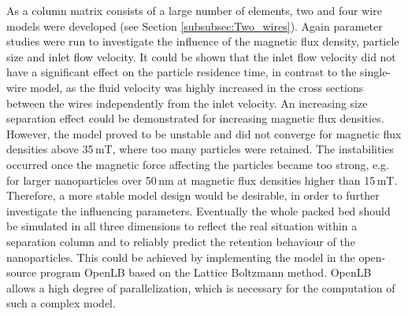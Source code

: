As a column matrix consists of a large number of elements, two and four wire models were developed (see Section \ref{subsubsec:Two_wires}). Again parameter studies were run to investigate the influence of the magnetic flux density, particle size and inlet flow velocity. It could be shown that the inlet flow velocity did not have a significant effect on the particle residence time, in contrast to the single-wire model, as the fluid velocity was highly increased in the cross sections between the wires independently from the inlet velocity. An increasing size separation effect could be demonstrated for increasing magnetic flux densities. However, the model proved to be unstable and did not converge for magnetic flux densities above 35\,mT, where too many particles were retained. The instabilities occurred once the magnetic force affecting the particles became too strong, e.g. for larger nanoparticles over 50\,nm at magnetic flux densities higher than 15\,mT. Therefore, a more stable model design would be desirable, in order to further investigate the influencing parameters. Eventually the whole packed bed should be simulated in all three dimensions to reflect the real situation within a separation column and to reliably predict the retention behaviour of the nanoparticles. This could be achieved by implementing the model in the open-source program OpenLB based on the Lattice Boltzmann method. OpenLB allows a high degree of parallelization, which is necessary for the computation of such a complex model.     


